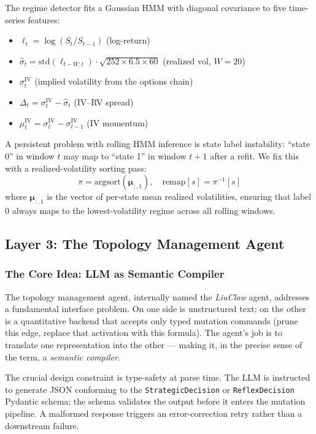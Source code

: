 \documentclass[11pt,a4paper]{article}
\begin{document}
The regime detector fits a Gaussian HMM with diagonal covariance to five time-series
features:
\begin{itemize}[nosep]
  \item $\ell_t = \log(S_t / S_{t-1})$ (log-return)
  \item $\hat{\sigma}_t = \text{std}(\ell_{t-W:t}) \cdot \sqrt{252 \times 6.5 \times 60}$ (realized vol, $W=20$)
  \item $\sigma^\text{IV}_t$ (implied volatility from the options chain)
  \item $\Delta_t = \sigma^\text{IV}_t - \hat{\sigma}_t$ (IV--RV spread)
  \item $\mu^\text{IV}_t = \sigma^\text{IV}_t - \sigma^\text{IV}_{t-1}$ (IV momentum)
\end{itemize}

A persistent problem with rolling HMM inference is state label instability: ``state 0''
in window $t$ may map to ``state 1'' in window $t+1$ after a refit. We fix this with a
realized-volatility sorting pass:
\begin{equation}
\pi = \text{argsort}(\bm{\mu}_{:,1}), \quad \text{remap}[s] = \pi^{-1}[s]
\label{eq:hmm_relabel}
\end{equation}
where $\bm{\mu}_{:,1}$ is the vector of per-state mean realized volatilities, ensuring
that label 0 always maps to the lowest-volatility regime across all rolling windows.

\subsection{Layer 3: The Topology Management Agent}
\label{sec:arch:agent}

\subsubsection{The Core Idea: LLM as Semantic Compiler}

The topology management agent, internally named the \emph{LiuClaw} agent, addresses a
fundamental interface problem. On one side is unstructured text; on the other is a
quantitative backend that accepts only typed mutation commands (prune this edge, replace
that activation with this formula). The agent's job is to translate one representation
into the other --- making it, in the precise sense of the term, a \emph{semantic
compiler}.

The crucial design constraint is type-safety at parse time. The LLM is instructed to
generate JSON conforming to the \texttt{StrategicDecision} or \texttt{ReflexDecision}
Pydantic schema; the schema validates the output before it enters the mutation pipeline.
A malformed response triggers an error-correction retry rather than a downstream
failure.
\end{document}
